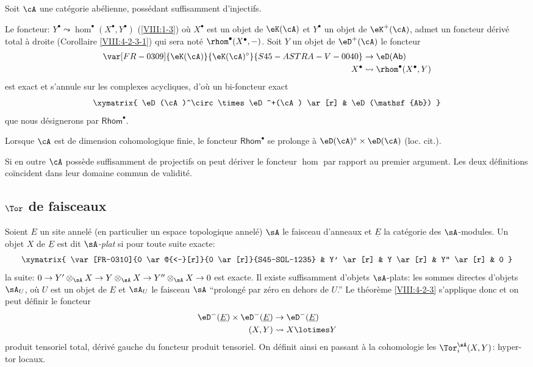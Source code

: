 Soit $\cA$ une catégorie abélienne, possédant suffisamment d'injectifs. 

Le foncteur: $Y^\bullet\leadsto \hom^\bullet(X^\bullet,Y^\bullet)$ (\ref{VIII:1-3}) 
où $X^\bullet$ est un objet de $\eK(\cA)$ et $Y^\bullet$ un objet de 
$\eK^+(\cA)$, admet un foncteur dérivé total à droite 
(Corollaire \ref{VIII:4-2-3-1}) qui sera noté $\rhom^\bullet(X^\bullet,-)$.  
Soit $Y$ un objet de $\eD^+(\cA)$ le foncteur 
\begin{align*}
  \var[FR-0309]{\eK(\cA)}{\eK(\cA)^\circ}{S45-ASTRA-V-0040} &\to \eD(\mathsf{Ab}) \\
  X^\bullet &\leadsto \rhom^\bullet(X^\bullet,Y) 
\end{align*}
est exact et s'annule sur les complexes acycliques, d'où un bi-foncteur 
exact 
\[\xymatrix{
  \eD(\cA)^\circ \times \eD^+(\cA) \ar[r] 
    & \eD(\mathsf{Ab}) 
}\]
que nous désignerons par $\mathsf{Rhom}^\bullet$. 

Lorsque $\cA$ est de dimension cohomologique finie, le foncteur 
$\mathsf{Rhom}^\bullet$ se prolonge à $\eD(\cA)^\circ\times \eD(\cA)$ 
(loc. cit.). 

Si en outre $\cA$ possède suffisamment de projectifs on peut dériver le 
foncteur $\hom$ par rapport au premier argument. Les deux définitions 
co\"incident dans leur domaine commun de validité. 










\subsection{\texorpdfstring{$\Tor$}{Tor} de faisceaux}\label{VIII:6-2}

Soient $E$ un site annelé (en particulier un espace topologique annelé) 
$\sA$ le faisceau d'anneaux et $\underline E$ la catégorie des 
$\sA$-modules. Un objet $X$ de $\underline E$ est dit 
\emph{$\sA$-plat} si pour toute suite exacte: 
\[\xymatrix{
  \var[FR-0310]{0 \ar@{<-}[r]}{0 \ar[r]}{S45-SOL-1235} 
    & Y' \ar[r] 
    & Y \ar[r] 
    & Y'' \ar[r] 
    & 0 
}\]
la suite: $0 \to Y'\otimes_\sA X \to Y\otimes_\sA X \to Y''\otimes_\sA X\to 0$ 
est exacte. Il existe suffisamment d'objets $\sA$-plats: les sommes directes 
d'objets $\sA_U$, où $U$ est un objet de $E$ et $\sA_U$ le faisceau 
$\sA$ ``prolongé par zéro en dehors de $U$.'' Le théorème 
\ref{VIII:4-2-3} s'applique donc et on peut définir le foncteur 
\begin{align*}
  \eD^-(\underline E) \times \eD^-(\underline E) &\to \eD^-(\underline E) \\
  (X,Y) &\leadsto X\lotimes Y 
\end{align*}
produit tensoriel total, dérivé gauche du foncteur produit tensoriel. 
On définit ainsi en passant à la cohomologie les $\Tor_i^\sA(X,Y)$: 
hyper-tor locaux. 

